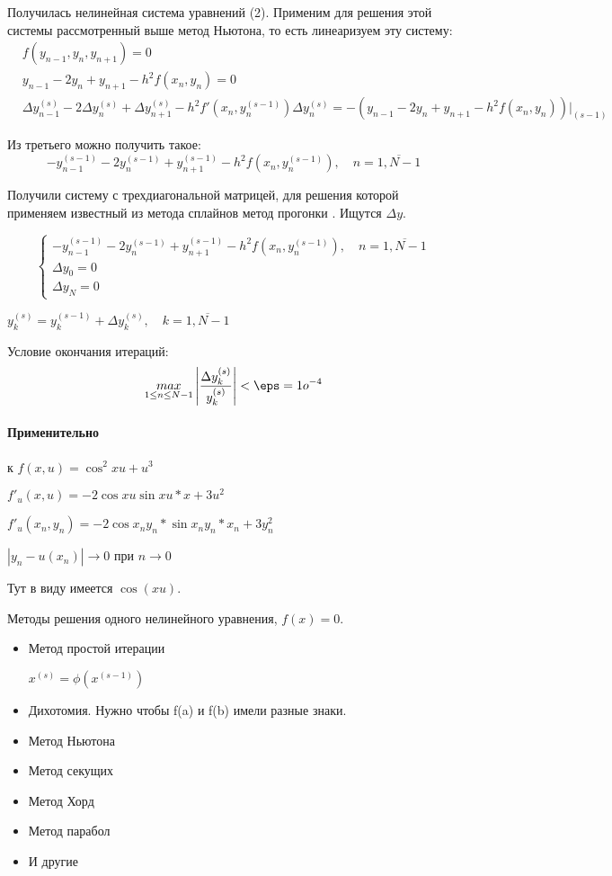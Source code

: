 Получилась нелинейная система уравнений (2). Применим для решения этой системы
рассмотренный выше метод Ньютона, то есть линеаризуем эту систему:
\begin{align*}
    &f(y_{n-1}, y_{n}, y_{n+1}) = 0\\
    &y_{n-1} - 2y_{n} + y_{n+1} - h^{2} f(x_{n},y_{n}) = 0\\
    &\Delta y_{n-1}^{(s)} - 2\Delta y_{n}^{(s)} + \Delta y_{n+1}^{(s)} - h^{2} f'(x_{n},
    y_{n}^{(s-1)})\Delta y_{n}^{(s)} = - (y_{n-1} - 2y_{n} + y_{n+1} - h^{2} f(x_{n},y_{n}))
    \bigg|_{(s-1)}
\end{align*}

Из третьего можно получить такое:
\[
-y_{n-1}^{(s-1)} - 2y_{n}^{(s-1)} + y_{n+1}^{(s-1)} - h^{2} f(x_{n},y_{n}^{(s-1)}), \quad 
n = \overline{1, N-1}
\] 

Получили систему с трехдиагональной матрицей, для решения которой применяем известный
из метода сплайнов метод прогонки . Ищутся $\Delta y$.

\[
\begin{cases}
-y_{n-1}^{(s-1)} - 2y_{n}^{(s-1)} + y_{n+1}^{(s-1)} - h^{2} f(x_{n},y_{n}^{(s-1)}), \quad 
n = \overline{1, N-1}\\
    \Delta y_0 = 0\\
    \Delta y_N = 0
\end{cases}
\] 

$y_k^{(s)} = y_k^{(s-1)} + \Delta y_k^{(s)}, \quad k = \overline{1, N-1}$

\medskip

Условие окончания итераций:
\[
    \underset{1 \le n \le N-1}{max} \left| \frac{\Delta y_k^{(s)}}{y_k^{(s)}} \right| < \eps = 1o^{-4} 
\]

\paragraph*{Применительно} к $f(x,u) = \cos^{2} xu + u^{3}$ 

$f'_u(x,u) = -2 \cos xu \sin xu * x + 3u^{2}$ 

$f'_u(x_{n},y_{n}) = -2 \cos x_{n}y_{n} * \sin x_{n}y_{n} * x_{n} + 3y_{n}^{2}$

$\left| y_{n} - u(x_{n}) \right| \to 0$ при $n \to 0$

Тут в виду имеется $\cos (xu)$.

\medskip

Методы решения одного нелинейного уравнения, $f(x) = 0$.
 \begin{itemize}
    \item Метод простой итерации

        $x^{(s)} = \phi(x^{(s-1)})$

    \item Дихотомия. Нужно чтобы f(a) и f(b) имели разные знаки.
    \item Метод Ньютона
    \item Метод секущих
    \item Метод Хорд
    \item Метод парабол
    \item И другие
\end{itemize}


